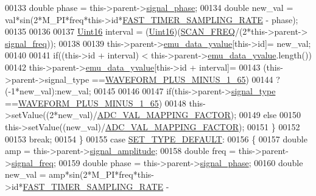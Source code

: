 \begin{DoxyCode}
00133         \textcolor{keywordtype}{double} phase   = this->parent->\hyperlink{a00004_af08de88fdfe283086e3cca97a2965678}{signal\_phase};
00134         \textcolor{keywordtype}{double} new\_val = val*sin(2*M\_PI*freq*this->\textcolor{keywordtype}{id}*\hyperlink{a00031_a3a4dcb8af26a561d90607a41a3745806}{FAST\_TIMER\_SAMPLING\_RATE} - 
      phase);
00135 
00136 
00137         \hyperlink{a00001_aae7407b021d43f7193a81a58cfb3e297}{Uint16} interval = (\hyperlink{a00001_aae7407b021d43f7193a81a58cfb3e297}{Uint16})(\hyperlink{a00031_a8127170b687c1f67a968886c128e76e4}{SCAN\_FREQ}/(2*this->parent->
      \hyperlink{a00004_a67039999d520fc483fab521fae5ddde4}{signal\_freq}));
00138 
00139         this->parent->\hyperlink{a00004_ad922d05d1e988d84f404c115fe909f72}{emu\_data\_yvalue}[this->id]= new\_val;
00140 
00141        \textcolor{keywordflow}{if}((this->\textcolor{keywordtype}{id} + interval) < this->parent->\hyperlink{a00004_ad922d05d1e988d84f404c115fe909f72}{emu\_data\_yvalue}.length())
00142         this->parent->\hyperlink{a00004_ad922d05d1e988d84f404c115fe909f72}{emu\_data\_yvalue}[this->id + interval]=
00143         (this->parent->signal\_type ==\hyperlink{a00034_a0923d3b365a36e1e8c401cec964aa36f}{WAVEFORM\_PLUS\_MINUS\_1\_65})
00144         ?(-1*new\_val):new\_val;
00145 
00146 
00147         \textcolor{keywordflow}{if}(this->parent->\hyperlink{a00004_a070edaec5aee6ba1f5a6866bc32c8ce4}{signal\_type} ==\hyperlink{a00034_a0923d3b365a36e1e8c401cec964aa36f}{WAVEFORM\_PLUS\_MINUS\_1\_65})
00148         this->setValue((2*new\_val)/\hyperlink{a00031_ada92d3eeeec0cbeee41e76a52d145792}{ADC\_VAL\_MAPPING\_FACTOR});
00149         \textcolor{keywordflow}{else}
00150         this->setValue((new\_val)/\hyperlink{a00031_ada92d3eeeec0cbeee41e76a52d145792}{ADC\_VAL\_MAPPING\_FACTOR});
00151         \}
00152 
00153     \textcolor{keywordflow}{break};
00154      \}
00155     \textcolor{keywordflow}{case} \hyperlink{a00034_afd1036bf6329d2ac31913e14c1f56725}{SET\_TYPE\_DEFAULT}:
00156     \{
00157         \textcolor{keywordtype}{double} amp     = this->parent->\hyperlink{a00004_a73dabe63bd74afe2776e8136211dc36e}{signal\_amplitude};
00158         \textcolor{keywordtype}{double} freq    = this->parent->\hyperlink{a00004_a67039999d520fc483fab521fae5ddde4}{signal\_freq};
00159         \textcolor{keywordtype}{double} phase   = this->parent->\hyperlink{a00004_af08de88fdfe283086e3cca97a2965678}{signal\_phase};
00160         \textcolor{keywordtype}{double} new\_val = amp*sin(2*M\_PI*freq*this->\textcolor{keywordtype}{id}*\hyperlink{a00031_a3a4dcb8af26a561d90607a41a3745806}{FAST\_TIMER\_SAMPLING\_RATE} - 

\end{DoxyCode}
